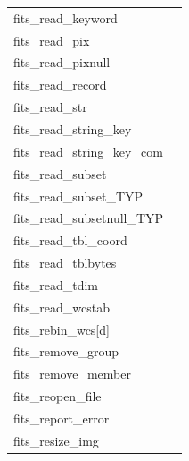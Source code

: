 \documentclass[11pt]{book}
\begin{document}
\begin{tabular}{lr}
fits\_read\_keyword      & \pageref{ffgkey} \\
fits\_read\_pix  & \pageref{ffgpxv} \\
fits\_read\_pixnull & \pageref{ffgpxf} \\
fits\_read\_record       & \pageref{ffgrec} \\
fits\_read\_str         & \pageref{ffgcrd} \\
fits\_read\_string\_key & \pageref{ffgsky} \\
fits\_read\_string\_key\_com & \pageref{ffgskyc} \\
fits\_read\_subset  & \pageref{ffgsv} \\
fits\_read\_subset\_TYP  & \pageref{ffgsvx} \pageref{ffgsvx2}\\
fits\_read\_subsetnull\_TYP & \pageref{ffgsfx} \pageref{ffgsfx2} \\
fits\_read\_tbl\_coord & \pageref{ffgtcs} \\
fits\_read\_tblbytes    & \pageref{ffgtbb} \\
fits\_read\_tdim         & \pageref{ffgtdm} \\
fits\_read\_wcstab       & \pageref{wcstab} \\
fits\_rebin\_wcs[d]  &  \pageref{rebinwcs} \\
fits\_remove\_group  & \pageref{ffgtrm} \\
fits\_remove\_member   & \pageref{ffgmrm} \\
fits\_reopen\_file      & \pageref{ffreopen} \\
fits\_report\_error   & \pageref{ffrprt} \\
fits\_resize\_img     & \pageref{ffrsim} \\
\end{tabular}
\end{document}
